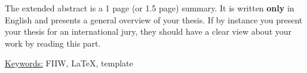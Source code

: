 The extended abstract is a 1 page (or 1.5 page) summary. It is written \textbf{only} in English and presents a general overview of your thesis. If by instance you present your thesis for an international jury, they should have a clear view about your work by reading this part.\par

\lipsum[70-73]

\underline{Keywords:} FIIW, \LaTeX, template